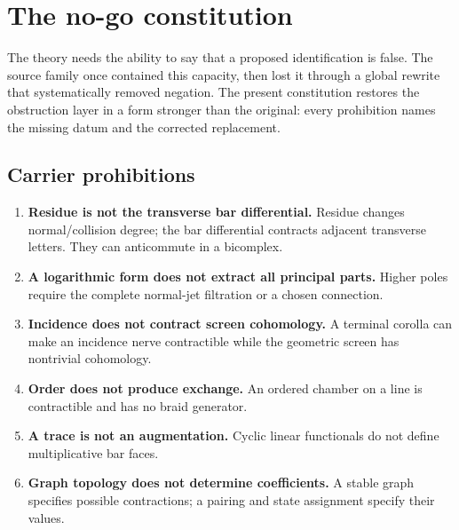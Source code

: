 \chapter{The no-go constitution}\label{chap:nogo}

The theory needs the ability to say that a proposed identification is false.  The source family once contained this capacity, then lost it through a global rewrite that systematically removed negation.  The present constitution restores the obstruction layer in a form stronger than the original: every prohibition names the missing datum and the corrected replacement.

\section{Carrier prohibitions}
\begin{enumerate}[series=nogo,label=\textbf{N\arabic*.},ref=N\arabic*]
\item \textbf{Residue is not the transverse bar differential.}  Residue changes normal/collision degree; the bar differential contracts adjacent transverse letters.  They can anticommute in a bicomplex.
\item \textbf{A logarithmic form does not extract all principal parts.}  Higher poles require the complete normal-jet filtration or a chosen connection.
\item \textbf{Incidence does not contract screen cohomology.}  A terminal corolla can make an incidence nerve contractible while the geometric screen has nontrivial cohomology.
\item \textbf{Order does not produce exchange.}  An ordered chamber on a line is contractible and has no braid generator.
\item \textbf{A trace is not an augmentation.}  Cyclic linear functionals do not define multiplicative bar faces.
\item \textbf{Graph topology does not determine coefficients.}  A stable graph specifies possible contractions; a pairing and state assignment specify their values.
\end{enumerate}

